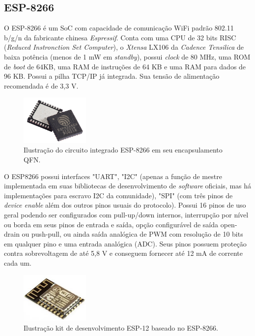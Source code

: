 \subsection{ESP-8266}

O ESP-8266 \cite{esp} é um \acf{SoC} com capacidade de comunicação \ac{WiFi} padrão 802.11 b/g/n da fabricante chinesa \textit{Espressif}. Conta com uma CPU de 32 bits RISC (\textit{Reduced Instronction Set Computer}), o \textit{Xtensa} LX106 da \textit{Cadence Tensilica} de baixa potência (menos de 1 mW em \textit{standby}), possui \textit{clock} de 80 MHz, uma ROM de \textit{boot} de 64KB, uma RAM de instruções de 64 KB e uma RAM para dados de 96 KB. Possui a pilha TCP/IP já integrada. Sua tensão de alimentação recomendada é de 3,3 V.

\begin{figure}[ht]
    \begin{center}
    \includegraphics[width=0.3\textwidth]{figuras/esp8266.jpg}
    \end{center}
    \caption[ESP-8266 em seu encapsulamento QFN.]{Ilustração do circuito integrado ESP-8266 em seu encapsulamento QFN.}
    \label{esp8266}
\end{figure}

O ESP8266 possui interfaces "UART", "I2C" (apenas a função de mestre implementada em suas bibliotecas de desenvolvimento de \textit{software} oficiais, mas há implementações para escravo I2C da comunidade), "SPI" (com três pinos de \textit{device enable} além dos outros pinos usuais do protocolo). Possui 16 pinos de uso geral podendo ser configurados com pull-up/down internos, interrupção por nível ou borda em seus pinos de entrada e saída, opção configurável de saída open-drain ou push-pull, ou ainda saída analógica de PWM com resolução de 10 bits em qualquer pino e uma entrada analógica (ADC). Seus pinos possuem proteção contra sobrevoltagem de até 5,8 V e conseguem fornecer até 12 mA de corrente cada um.

\begin{figure}[ht]
    \begin{center}
    \includegraphics[width=0.3\textwidth]{figuras/esp12.jpg}
    \end{center}
    \caption[Kit de desenvolvimento ESP-12.]{Ilustração kit de desenvolvimento ESP-12 baseado no ESP-8266.}
    \label{esp12}
\end{figure}

